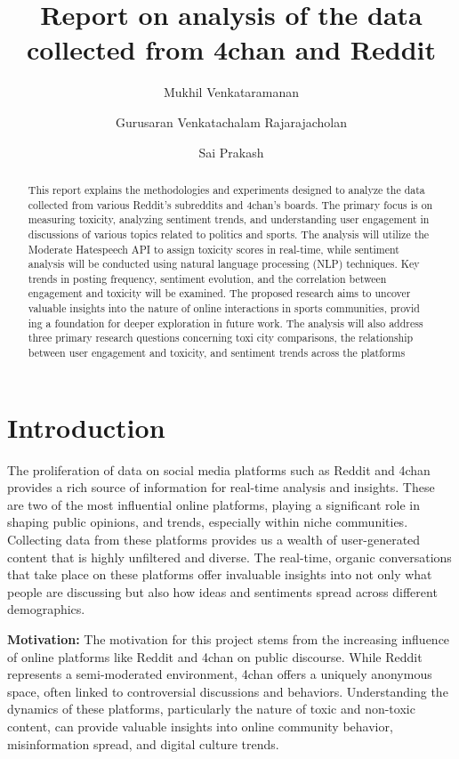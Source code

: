 \documentclass[sigconf]{acmart}
\title{Report on analysis of the data collected from 4chan and Reddit}
\author{Mukhil Venkataramanan}
\affiliation{
  \institution{SUNY Binghamton}
  \city{Binghamton}
  \country{USA}
}
\author{Gurusaran Venkatachalam Rajarajacholan}
\affiliation{
  \institution{SUNY Binghamton}
  \city{Binghamton}
  \country{USA}
}
\author{Sai Prakash}
\affiliation{
  \institution{SUNY Binghamton}
  \city{Binghamton}
  \country{USA}
}
\begin{document}
\begin{abstract}
 This report explains the methodologies and experiments designed
 to analyze the data collected from various Reddit’s subreddits and
 4chan’s boards. The primary focus is on measuring toxicity,
 analyzing sentiment trends, and understanding user engagement in
discussions of various topics related to politics and sports. The analysis will utilize the Moderate Hatespeech API to assign toxicity scores in real-time, while sentiment analysis will be conducted using natural language processing (NLP) techniques. Key trends in posting frequency, sentiment evolution, and the correlation between engagement and toxicity will be examined. The proposed research aims to uncover valuable insights
 into the nature of online interactions in sports communities, provid
ing a foundation for deeper exploration in future work. The analysis
 will also address three primary research questions concerning toxi
city comparisons, the relationship between user engagement and
 toxicity, and sentiment trends across the platforms

\end{abstract}


\maketitle

\section{Introduction}
The proliferation of data on social media platforms such as Reddit and 4chan provides a rich source of information for real-time analysis and insights. These are two of the most influential online platforms, playing a significant role in shaping public opinions, and trends, especially within niche communities. Collecting data from these platforms provides us a wealth of user-generated content that is highly unfiltered and diverse. The real-time, organic conversations that take place on these platforms offer invaluable insights into not only what people are discussing but also how ideas and sentiments spread across different demographics.\newline

\textbf{Motivation:}
The motivation for this project stems from the increasing influence of online platforms like Reddit and 4chan on public discourse. While Reddit represents a semi-moderated environment, 4chan offers a uniquely anonymous space, often linked to controversial discussions and behaviors. Understanding the dynamics of these platforms, particularly the nature of toxic and non-toxic content, can provide valuable insights into online community behavior, misinformation spread, and digital culture trends.\newline
\end{document}
